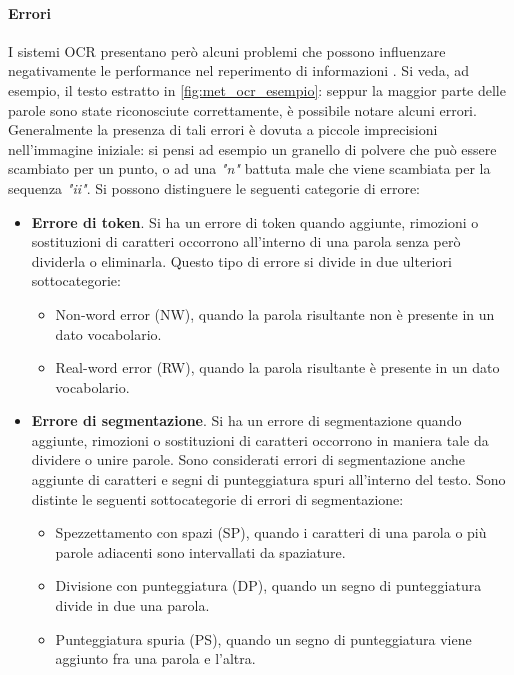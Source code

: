 \paragraph{Errori}
I sistemi OCR presentano però alcuni problemi che possono influenzare negativamente le performance nel reperimento di informazioni \cite{impatto_ocr_1}\cite{impatto_ocr_2}. Si veda, ad esempio, il testo estratto in \autoref{fig:met_ocr_esempio}: seppur la maggior parte delle parole sono state riconosciute correttamente, è possibile notare alcuni errori. 
Generalmente la presenza di tali errori è dovuta a piccole imprecisioni nell'immagine iniziale: si pensi ad esempio un granello di polvere che può essere scambiato per un punto, o ad una \textit{"n"} battuta male che viene scambiata per la sequenza \textit{"ii"}.
Si possono distinguere le seguenti categorie di errore:
\begin{itemize}
\item \textbf{Errore di token}. Si ha un errore di token quando aggiunte, rimozioni o sostituzioni di caratteri occorrono all'interno di una parola senza però dividerla o eliminarla. Questo tipo di errore si divide in due ulteriori sottocategorie:
	\begin{itemize}
	\item Non-word error (NW), quando la parola risultante non è presente in un dato vocabolario.
	\item Real-word error (RW), quando la parola risultante è presente in un dato vocabolario.
	\end{itemize}
	
\item \textbf{Errore di segmentazione}. Si ha un errore di segmentazione quando aggiunte, rimozioni o sostituzioni di caratteri occorrono in maniera tale da dividere o unire parole. Sono considerati errori di segmentazione anche aggiunte di caratteri e segni di punteggiatura spuri all'interno del testo. Sono distinte le seguenti sottocategorie di errori di segmentazione:
	\begin{itemize}
	\item Spezzettamento con spazi (SP), quando i caratteri di una parola o più parole adiacenti sono intervallati da spaziature.
	\item Divisione con punteggiatura (DP), quando un segno di punteggiatura divide in due una parola.
	\item Punteggiatura spuria (PS), quando un segno di punteggiatura viene aggiunto fra una parola e l'altra.
	\end{itemize}
\end{itemize}

